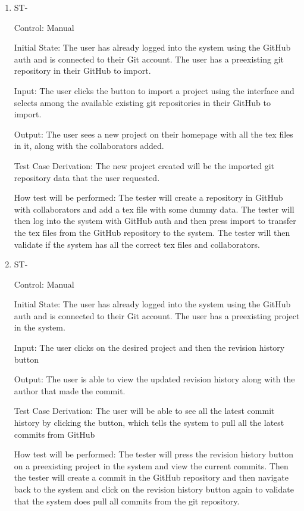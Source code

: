 \documentclass[12pt, titlepage]{article}
\newcounter{TESTID}
\newcommand\TESTNUM{\stepcounter{TESTID}\theTESTID}
\begin{document}
\begin{enumerate}
		\item{ST-\TESTNUM\\}
		
		Control: Manual
		
		Initial State: The user has already logged into the system using the GitHub auth and is connected to their Git account. The user has a preexisting git repository in their GitHub to import.
		
		Input: The user clicks the button to import a project using the interface and selects among the available existing git repositories in their GitHub to import. 
		
		Output: The user sees a new project on their homepage with all the tex files in it, along with the collaborators added.
		
		Test Case Derivation: The new project created will be the imported git repository data that the user requested.
		
		How test will be performed: The tester will create a repository in GitHub with collaborators and add a tex file with some dummy data. The tester will then log into the system with GitHub auth and then press import to transfer the tex files from the GitHub repository to the system. The tester will then validate if the system has all the correct tex files and collaborators.
		
		\item{ST-\TESTNUM\\}
		
		Control: Manual
		
		Initial State: The user has already logged into the system using the GitHub auth and is connected to their Git account. The user has a preexisting project in the system.
		
		Input: The user clicks on the desired project and then the revision history button
		
		Output: The user is able to view the updated revision history along with the author that made the commit.
		
		Test Case Derivation: The user will be able to see all the latest commit history by clicking the button, which tells the system to pull all the latest commits from GitHub 
		
		How test will be performed: The tester will press the revision history button on a preexisting project in the system and view the current commits. Then the tester will create a commit in the GitHub repository and then navigate back to the system and click on the revision history button again to validate that the system does pull all commits from the git repository.
		

\end{enumerate}
\end{document}
